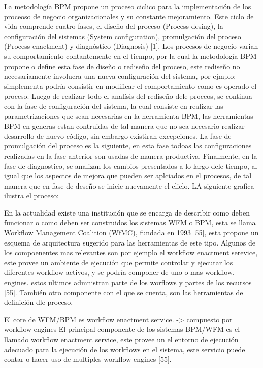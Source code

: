 La metodología BPM propone un proceso ciclico para la implementación de los proceoso de negocio organizacionales y su constante mejoramiento. Este ciclo de vida comprende cuatro fases, el diseño del proceso (Process desing), la configuración del sistemas (System configuration), promulgación del proceso (Process enactment) y diagnóstico (Diagnosis) [1]. 
Los procesos de negocio varian su comportamiento contantemente en el tiempo, por la cual la metodología BPM propone o define esta fase de diseño o rediseño del proceso, este rediseño no necesariamente involucra una nueva configuración del sistema, por ejmplo: simplementa podría consistir en modificar el comportamiento como es operado el proceso. Luego de realizar todo el analísis del rediseño dele proceos, se continua con la fase de configuración del sistema, la cual consiste en realizar las parametrizaciones que sean necesarias en la herramienta BPM, las herramientas BPM en generas estan contruidas de tal manera que no sea necesario realizar desarrollo de nuevo código, sin embargo existiran excepciones. La fase de promulgación del proceso es la siguiente, en esta fase todoas las configuraciones realizadas en la fase anterior son usadas de manera productiva. Finalmente, en la fase de diagnostico, se analizan los cambios presentados a lo largo dele tiempo, al igual que los aspectos de mejora que pueden ser aplciados en el procesos, de tal manera que en fase de deseño se inicie nuevamente el cliclo. LA siguiente grafica ilustra el proceso:


En la actualidad existe una institución que se encarga de describir como deben funcionar o como deben ser construidos los sistemas WFM o BPM, esta se llama Workflow Management Coalition (WfMC), fundada en 1993 [55], esta propone un esquema de arquitectura sugerido para las herramientas de este tipo. Algunos de los compoenentes mas relevantes son por ejemplo el workflow enactment serevice, este provee un ambiente de ejecución que permite controlar y ejecutar los diferentes workflow activos, y se podría componer de uno o mas workflow. engines. estos ultimos admnistran parte de los worflows y partes de los recursos [55]. También otro componente con el que se cuenta, son las herramientas de definición dle proceso, 


El core de WFM/BPM es workflow enactment service. -> compuesto por workflow engines
El principal componente de los sistemas BPM/WFM es el llamado workflow enactment service, este provee un el entorno de ejecución adecuado para la ejecución de los workflows en el sistema, este servicio puede contar o hacer uso de multiples workflow engines [55]. 

